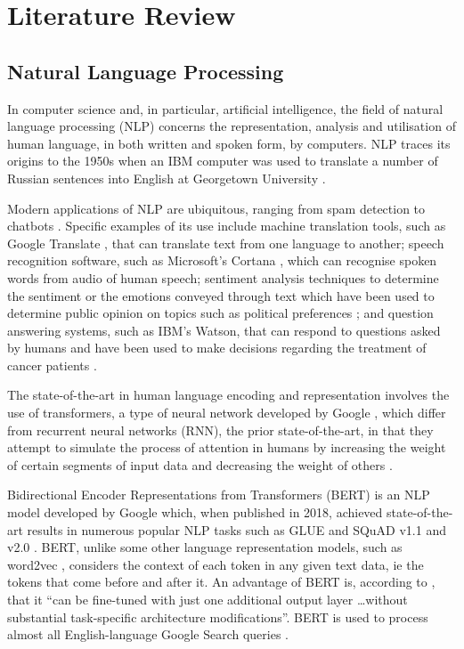\chapter{Literature Review}  \label{sec:LR}

\section{Natural Language Processing} \label{sec:LR_NLP}

In computer science and, in particular, artificial intelligence, the field of natural language processing (NLP) concerns the representation, analysis and utilisation of human language, in both written and spoken form, by computers. NLP traces its origins to the 1950s when an IBM computer was used to translate a number of Russian sentences into English at Georgetown University \cite{Hutchins2004_MT}.

Modern applications of NLP are ubiquitous, ranging from spam detection \cite{Jindal2007_Spam} to chatbots \cite{Adamopoulou2020_Chatbot}. Specific examples of its use include machine translation tools, such as Google Translate \cite{GoogleTranslate}, that can translate text from one language to another; speech recognition software, such as Microsoft's Cortana \cite{MicrosoftSpeechRecognition}, which can recognise spoken words from audio of human speech; sentiment analysis techniques to determine the sentiment or the emotions conveyed through text which have been used to determine public opinion on topics such as political preferences \cite{Ceron2014_Sentiment}; and question answering systems, such as IBM's Watson, that can respond to questions asked by humans and have been used to make decisions regarding the treatment of cancer patients \cite{AOCNP2015_Watson}.

The state-of-the-art in human language encoding and representation involves the use of transformers, a type of neural network developed by Google \cite{Vaswani2017_Transformers}, which differ from recurrent neural networks (RNN), the prior state-of-the-art, in that they attempt to simulate the process of attention in humans by increasing the weight of certain segments of input data and decreasing the weight of others \cite{Bahdanau2014_Attention}.

Bidirectional Encoder Representations from Transformers (BERT) is an NLP model developed by Google which, when published in 2018, achieved state-of-the-art results in numerous popular NLP tasks such as GLUE and SQuAD v1.1 and v2.0 \cite{Devlin2018_BERT}. BERT, unlike some other language representation models, such as word2vec \cite{Mikolov2013_W2V}, considers the context of each token in any given text data, ie the tokens that come before and after it. An advantage of BERT is, according to \cite{Devlin2018_BERT}, that it ``can be fine-tuned with just one additional output layer \ldots without substantial task-specific architecture modifications''. BERT is used to process almost all English-language Google Search queries \cite{GoogleSearchBERT}.

